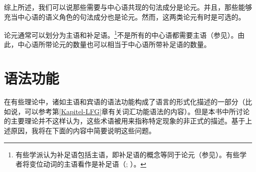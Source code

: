 综上所述，我们可以说那些需要与中心语共现的句法成分是论元。并且，那些能够充当中心语的语义角色的句法成分也是论元。然而，这两类论元有时是可选的。

论元通常可以划分为主语和补足语。\footnote{%
有些学派认为补足语包括主语，即补足语的概念等同于论元（参见\citealp[]{Gross2003a}）。有些学者将变位动词的主语看作是补足语（\citealp{Pollard90a-Eng}; \citealp[]{Eisenberg94b}）。}不是所有的中心语都需要主语（参见\citealp[\S~3.2]{MuellerLehrbuch1}）。由此，中心语所带论元的数量也可以相当于中心语所带补足语的数量。

\section{语法功能}
\label{Abschnitt-GF}
在有些理论中，诸如主语和宾语的语法功能构成了语言的形式化描述的一部分（比如说，可以参考第\ref{Kapitel-LFG}章有关词汇功能语法的内容）。但是本书中所讨论的主要理论并不这样认为，这些术语被用来指称特定现象的非正式的描述。基于上述原因，我将在下面的内容中简要说明这些问题。

